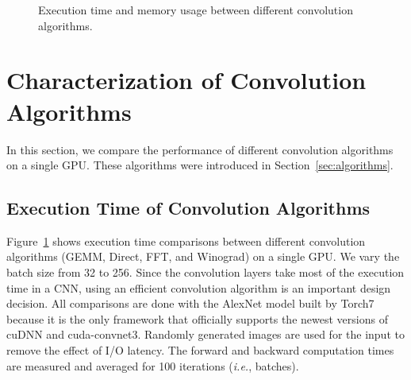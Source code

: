\begin{figure}[!t]
  \centering
  \hfil
  \caption{Execution time and memory usage between different convolution algorithms.}
  \label{fig_conv_time}
\end{figure}%

\section{Characterization of Convolution Algorithms}
\label{convolution-algorithms}
In this section, we compare the performance of different convolution algorithms on a single GPU. These algorithms were introduced in Section~\ref{sec:algorithms}. 

\subsection{Execution Time of Convolution Algorithms}
Figure~\ref{fig_conv_time} shows execution time comparisons between different convolution algorithms (\textsf{GEMM}, \textsf{Direct}, \textsf{FFT}, and \textsf{Winograd}) on a single GPU. We vary the batch size from 32 to 256. Since the convolution layers take most of the execution time in a CNN, using an efficient convolution algorithm is an important design decision. All comparisons are done with the AlexNet model built by Torch7 because it is the only framework that officially supports the newest versions of cuDNN and cuda-convnet3. Randomly generated images are used for the input to remove the effect of I/O latency. The forward and backward computation times are measured and averaged for 100 iterations (\textit{i.e.}, batches). 

